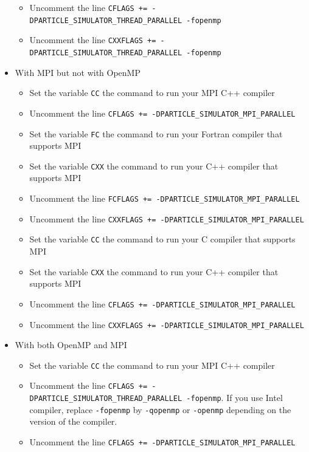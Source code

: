 \begin{itemize}
\begin{itemize}
\item Uncomment the line \texttt{CFLAGS += -DPARTICLE\_SIMULATOR\_THREAD\_PARALLEL -fopenmp}
\item Uncomment the line \texttt{CXXFLAGS += -DPARTICLE\_SIMULATOR\_THREAD\_PARALLEL -fopenmp}
\endifC
\end{itemize}
\item With MPI but not with OpenMP
\begin{itemize}
\ifCpp %
\item Set the variable \texttt{CC} the command to run your MPI C++ compiler
\item Uncomment the line \texttt{CFLAGS += -DPARTICLE\_SIMULATOR\_MPI\_PARALLEL}
\endifCpp
\ifFtn %
\item Set the variable \texttt{FC} the command to run your Fortran compiler that supports MPI
\item Set the variable \texttt{CXX} the command to run your C++ compiler that supports MPI
\item Uncomment the line \texttt{FCFLAGS += -DPARTICLE\_SIMULATOR\_MPI\_PARALLEL}
\item Uncomment the line \texttt{CXXFLAGS += -DPARTICLE\_SIMULATOR\_MPI\_PARALLEL}
\endifFtn
\ifC %
\item Set the variable \texttt{CC} the command to run your C compiler that supports MPI
\item Set the variable \texttt{CXX} the command to run your C++ compiler that supports MPI
\item Uncomment the line \texttt{CFLAGS += -DPARTICLE\_SIMULATOR\_MPI\_PARALLEL}
\item Uncomment the line \texttt{CXXFLAGS += -DPARTICLE\_SIMULATOR\_MPI\_PARALLEL}
\endifC
\end{itemize}
\item With both OpenMP and MPI
\begin{itemize}
\ifCpp %
\item Set the variable \texttt{CC} the command to run your MPI C++ compiler
\item Uncomment the line \texttt{CFLAGS += -DPARTICLE\_SIMULATOR\_THREAD\_PARALLEL -fopenmp}. If you use Intel compiler, replace \texttt{-fopenmp} by \texttt{-qopenmp} or \texttt{-openmp} depending on the version of the compiler.
  \item Uncomment the line \texttt{CFLAGS += -DPARTICLE\_SIMULATOR\_MPI\_PARALLEL}
\endifCpp

\end{itemize}
\end{itemize}
